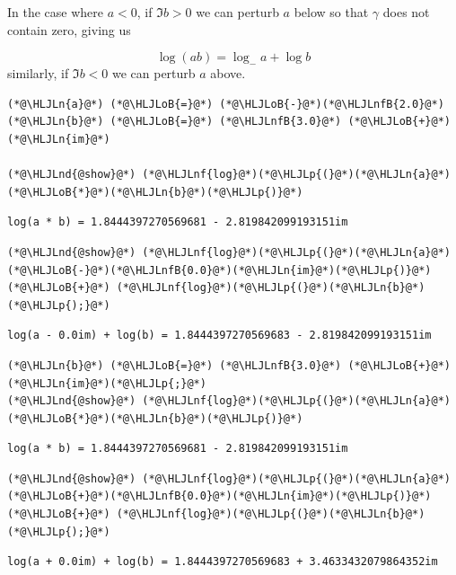 \documentclass[12pt,a4paper]{article}
\newcommand{\HLJLn}[1]{#1}
\newcommand{\HLJLnd}[1]{\textcolor[RGB]{214,102,97}{#1}}
\newcommand{\HLJLnf}[1]{\textcolor[RGB]{66,102,213}{#1}}
\newcommand{\HLJLnfB}[1]{\textcolor[RGB]{59,151,46}{#1}}
\newcommand{\HLJLoB}[1]{\textcolor[RGB]{102,102,102}{\textbf{#1}}}
\newcommand{\HLJLp}[1]{#1}
\begin{document}
In the case where $a < 0$, if $\Im b > 0$ we can perturb $a$ below so that $\gamma$ does not contain zero, giving us

\[
\log(ab) = \log_- a + \log b
\]
similarly, if $\Im b < 0$ we can perturb $a$ above.


\begin{lstlisting}
(*@\HLJLn{a}@*) (*@\HLJLoB{=}@*) (*@\HLJLoB{-}@*)(*@\HLJLnfB{2.0}@*)
(*@\HLJLn{b}@*) (*@\HLJLoB{=}@*) (*@\HLJLnfB{3.0}@*) (*@\HLJLoB{+}@*) (*@\HLJLn{im}@*)

(*@\HLJLnd{@show}@*) (*@\HLJLnf{log}@*)(*@\HLJLp{(}@*)(*@\HLJLn{a}@*)(*@\HLJLoB{*}@*)(*@\HLJLn{b}@*)(*@\HLJLp{)}@*)
\end{lstlisting}

\begin{lstlisting}
log(a * b) = 1.8444397270569681 - 2.819842099193151im
\end{lstlisting}


\begin{lstlisting}
(*@\HLJLnd{@show}@*) (*@\HLJLnf{log}@*)(*@\HLJLp{(}@*)(*@\HLJLn{a}@*)(*@\HLJLoB{-}@*)(*@\HLJLnfB{0.0}@*)(*@\HLJLn{im}@*)(*@\HLJLp{)}@*) (*@\HLJLoB{+}@*) (*@\HLJLnf{log}@*)(*@\HLJLp{(}@*)(*@\HLJLn{b}@*)(*@\HLJLp{);}@*)
\end{lstlisting}

\begin{lstlisting}
log(a - 0.0im) + log(b) = 1.8444397270569683 - 2.819842099193151im
\end{lstlisting}


\begin{lstlisting}
(*@\HLJLn{b}@*) (*@\HLJLoB{=}@*) (*@\HLJLnfB{3.0}@*) (*@\HLJLoB{+}@*) (*@\HLJLn{im}@*)(*@\HLJLp{;}@*)
(*@\HLJLnd{@show}@*) (*@\HLJLnf{log}@*)(*@\HLJLp{(}@*)(*@\HLJLn{a}@*)(*@\HLJLoB{*}@*)(*@\HLJLn{b}@*)(*@\HLJLp{)}@*)
\end{lstlisting}

\begin{lstlisting}
log(a * b) = 1.8444397270569681 - 2.819842099193151im
\end{lstlisting}


\begin{lstlisting}
(*@\HLJLnd{@show}@*) (*@\HLJLnf{log}@*)(*@\HLJLp{(}@*)(*@\HLJLn{a}@*)(*@\HLJLoB{+}@*)(*@\HLJLnfB{0.0}@*)(*@\HLJLn{im}@*)(*@\HLJLp{)}@*) (*@\HLJLoB{+}@*) (*@\HLJLnf{log}@*)(*@\HLJLp{(}@*)(*@\HLJLn{b}@*)(*@\HLJLp{);}@*)
\end{lstlisting}

\begin{lstlisting}
log(a + 0.0im) + log(b) = 1.8444397270569683 + 3.4633432079864352im
\end{lstlisting}
\end{document}
